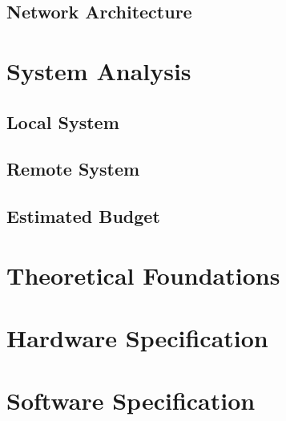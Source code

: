 \documentclass[12pt, letterpaper]{report}
\begin{document}
\section{Network Architecture}


\clearpage


\chapter{System Analysis}

\section{Local System}


\clearpage
\section{Remote System}


\clearpage
\section{Estimated Budget}


\clearpage


\chapter{Theoretical Foundations}


\clearpage
\chapter{Hardware Specification}


\clearpage
\chapter{Software Specification}




\end{document}
